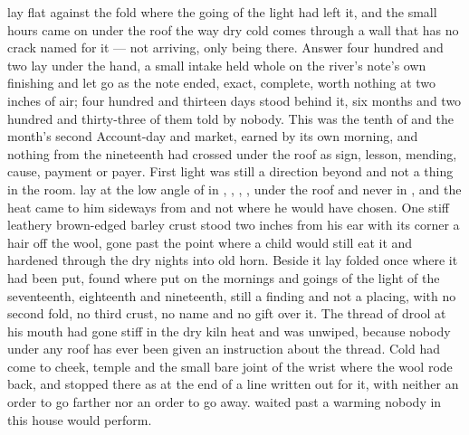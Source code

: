 
 lay flat against the fold where the going of the light had left it, and the small hours came on under the roof the way dry cold comes through a wall that has no crack named for it --- not arriving, only being there. Answer four hundred and two lay under the hand, a small intake held whole on the river's note's own finishing and let go as the note ended, exact, complete, worth nothing at two inches of air; four hundred and thirteen days stood behind it, six months and two hundred and thirty-three of them told by nobody. This was the tenth of  and the month's second Account-day and market, earned by its own morning, and nothing from the nineteenth had crossed under the roof as sign, lesson, mending, cause, payment or payer. First light was still a direction beyond  and not a thing in the room.  lay at the low angle of  in , , , , under the roof and never in , and the heat came to him sideways from  and not where he would have chosen. One stiff leathery brown-edged barley crust stood two inches from his ear with its corner a hair off the wool, gone past the point where a child would still eat it and hardened through the dry nights into old horn. Beside it  lay folded once where it had been put, found where put on the mornings and goings of the light of the seventeenth, eighteenth and nineteenth, still a finding and not a placing, with no second fold, no third crust, no name and no gift over it. The thread of drool at his mouth had gone stiff in the dry kiln heat and was unwiped, because nobody under any roof has ever been given an instruction about the thread. Cold had come to cheek, temple and the small bare joint of the wrist where the wool rode back, and stopped there as at the end of a line written out for it, with neither an order to go farther nor an order to go away.  waited past a warming nobody in this house would perform.


